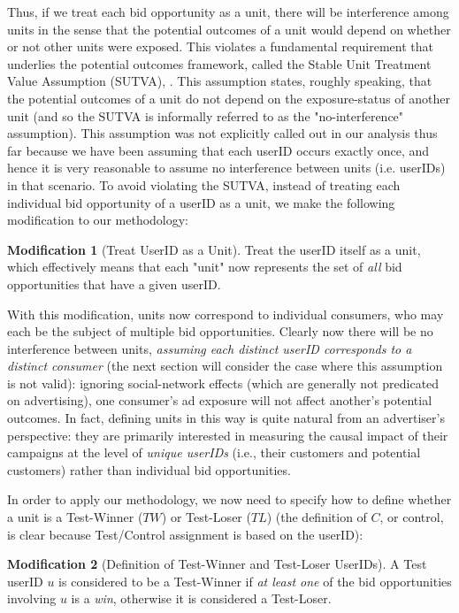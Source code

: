 \documentclass[11pt,a4paper]{article}
\theoremstyle{definition}
\theoremstyle{remark}
\theoremstyle{definition}
\theoremstyle{definition}
\theoremstyle{definition}
\theoremstyle{definition}
\theoremstyle{definition}
\newtheorem{modification}{Modification}[section]
\theoremstyle{definition}
\begin{document}
Thus, if we treat each bid opportunity as a unit, there will be interference among units in the sense that the potential outcomes of a unit would depend on whether or not other units were exposed. This violates a fundamental requirement that underlies the potential outcomes framework, called the Stable Unit Treatment Value Assumption (SUTVA), \cite{Rubin_Causal_2005}. This assumption states, roughly speaking, that the potential outcomes of a unit do not depend on the exposure-status of another unit (and so the SUTVA is informally referred to as the "no-interference" assumption). This assumption was not explicitly called out in our analysis thus far because we have been assuming that each userID occurs exactly once, and hence it is very reasonable to assume no interference between units (i.e. userIDs) in that scenario.
To avoid violating the SUTVA, instead of treating each individual bid opportunity of a userID as a unit, we make the following modification to our methodology:

\begin{modification}[Treat UserID as a Unit]
Treat the userID itself as a unit, which effectively means that each "unit" now represents the set of \textit{all} bid opportunities that have a given userID. 
\end{modification}

With this modification, units now correspond to individual consumers, who may each be the subject of multiple bid opportunities. Clearly now there will be no interference between units, \textit{assuming each distinct userID corresponds to a distinct consumer} (the next section will consider the case where this assumption is not valid): ignoring social-network effects (which are generally not predicated on advertising), one consumer's ad exposure will not affect another's potential outcomes. In fact, defining units in this way is quite natural from an advertiser's perspective: they are primarily interested in measuring the causal impact of their campaigns at the level of \textit{unique userIDs} (i.e., their customers and potential customers) rather than individual bid opportunities.

In order to apply our methodology, we now need to specify how to define whether a unit is a Test-Winner ($TW$) or Test-Loser ($TL$) (the definition of $C$, or control, is clear because Test/Control assignment is based on the userID):

\begin{modification}[Definition of Test-Winner and Test-Loser UserIDs]
A Test userID $u$ is considered to be a Test-Winner if \textit{at least one} of the bid opportunities involving $u$ is a \textit{win}, otherwise it is considered a Test-Loser.
\end{modification}
\end{document}
